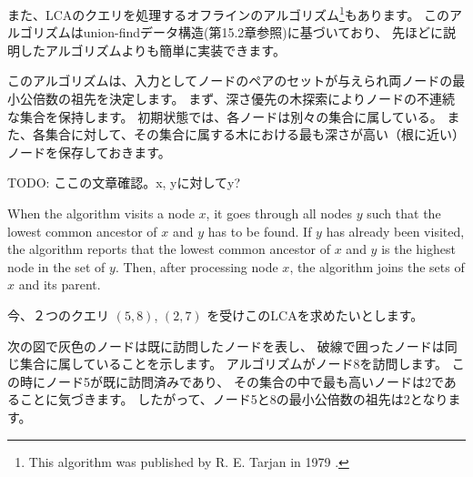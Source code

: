 また、LCAのクエリを処理するオフラインのアルゴリズム\footnote{This
algorithm was published by R. E. Tarjan in 1979 \cite{tar79}.}もあります。
このアルゴリズムはunion-findデータ構造(第15.2章参照)に基づいており、
先ほどに説明したアルゴリズムよりも簡単に実装できます。

このアルゴリズムは、入力としてノードのペアのセットが与えられ両ノードの最小公倍数の祖先を決定します。
まず、深さ優先の木探索によりノードの不連続な集合を保持します。
初期状態では、各ノードは別々の集合に属している。
また、各集合に対して、その集合に属する木における最も深さが高い（根に近い）ノードを保存しておきます。

TODO: ここの文章確認。x, yに対してy?

When the algorithm visits a node $x$,
it goes through all nodes $y$ such that
the lowest common ancestor of $x$ and $y$
has to be found.
If $y$ has already been visited,
the algorithm reports that the
lowest common ancestor of $x$ and $y$
is the highest node in the set of $y$.
Then, after processing node $x$,
the algorithm joins the sets of $x$ and its parent.

今、２つのクエリ $(5,8)$, $(2,7)$ を受けこのLCAを求めたいとします。
\begin{center}
\end{center}


次の図で灰色のノードは既に訪問したノードを表し、
破線で囲ったノードは同じ集合に属していることを示します。
アルゴリズムがノード8を訪問します。
この時にノード5が既に訪問済みであり、
その集合の中で最も高いノードは2であることに気づきます。
したがって、ノード5と8の最小公倍数の祖先は2となります。


